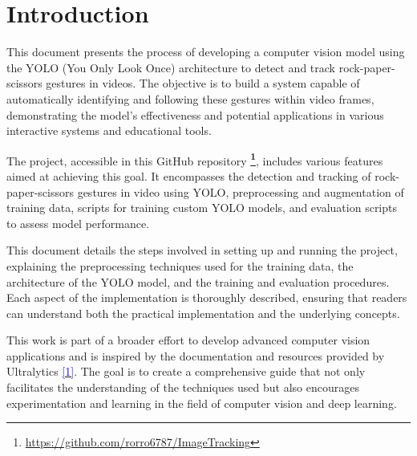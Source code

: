 \documentclass[../main]{subfiles}
\begin{document}
\chapter{Introduction}

{
\hypersetup{linkcolor=black}
\minitoc
}

This document presents the process of developing a computer vision model using the YOLO (You Only Look Once) architecture to detect and track rock-paper-scissors gestures in videos. The objective is to build a system capable of automatically identifying and following these gestures within video frames, demonstrating the model's effectiveness and potential applications in various interactive systems and educational tools.

The project, accessible in this GitHub repository \textbf{\footnote{\url{https://github.com/rorro6787/ImageTracking}}}, includes various features aimed at achieving this goal. It encompasses the detection and tracking of rock-paper-scissors gestures in video using YOLO, preprocessing and augmentation of training data, scripts for training custom YOLO models, and evaluation scripts to assess model performance.

This document details the steps involved in setting up and running the project, explaining the preprocessing techniques used for the training data, the architecture of the YOLO model, and the training and evaluation procedures. Each aspect of the implementation is thoroughly described, ensuring that readers can understand both the practical implementation and the underlying concepts.

This work is part of a broader effort to develop advanced computer vision applications and is inspired by the documentation and resources provided by Ultralytics \hyperlink{target:zona}{\textcolor{blue}{[1]}}. The goal is to create a comprehensive guide that not only facilitates the understanding of the techniques used but also encourages experimentation and learning in the field of computer vision and deep learning.
\end{document}
